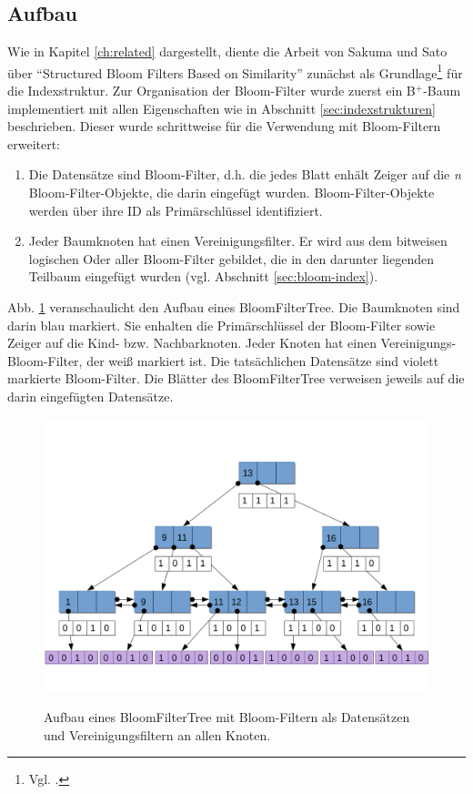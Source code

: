 \subsection{Aufbau}\label{sec:aufbau}
Wie in Kapitel \ref{ch:related} dargestellt, diente die Arbeit von Sakuma und Sato über "`Structured Bloom Filters Based on Similarity"' zunächst als Grundlage\footnote{Vgl. \cite{Sakuma2011}.} für die Indexstruktur. Zur Organisation der Bloom-Filter wurde zuerst ein B$^+$-Baum implementiert mit allen Eigenschaften wie in Abschnitt \ref{sec:indexstrukturen} beschrieben. Dieser wurde schrittweise für die Verwendung mit Bloom-Filtern erweitert: 
\begin{enumerate}
	\item Die Datensätze sind Bloom-Filter, d.h. die jedes Blatt enhält Zeiger auf die \textit{n} Bloom-Filter-Objekte, die darin eingefügt wurden. Bloom-Filter-Objekte werden über ihre ID als Primärschlüssel identifiziert. 
	\item Jeder Baumknoten hat einen Vereinigungsfilter. Er wird aus dem bitweisen logischen Oder aller Bloom-Filter gebildet, die in den darunter liegenden Teilbaum eingefügt wurden (vgl. Abschnitt \ref{sec:bloom-index}).
\end{enumerate}
Abb. \ref{fig:pic6} veranschaulicht den Aufbau eines BloomFilterTree. Die Baumknoten sind darin blau markiert. Sie enhalten die Primärschlüssel der Bloom-Filter sowie Zeiger auf die Kind- bzw. Nachbarknoten. Jeder Knoten hat einen Vereinigungs-Bloom-Filter, der weiß markiert ist. Die tatsächlichen Datensätze sind violett markierte Bloom-Filter. Die Blätter des BloomFilterTree verweisen jeweils auf die darin eingefügten Datensätze.
\newpage
\begin{figure}[hpbt]
  \centering
  \includegraphics[width=1.0\textwidth]{pictures/bloom-filter-tree.png}\\
  \caption[Aufbau eines BloomFilterTree]{Aufbau eines BloomFilterTree mit Bloom-Filtern als Datensätzen und Vereinigungsfiltern an allen Knoten.}\label{fig:pic6}
\end{figure}
